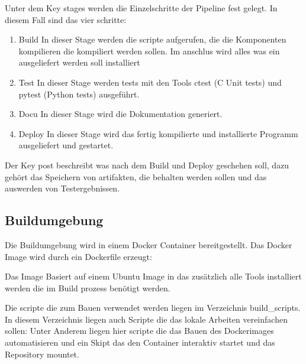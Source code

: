 Unter dem Key   \glqq   stages\grqq{} werden die Einzelschritte der Pipeline fest gelegt. In diesem Fall sind das vier schritte: 
\begin{enumerate}
    \item{Build} In dieser Stage werden die scripte aufgerufen, die die Komponenten kompilieren die kompiliert werden sollen. Im anschlus wird alles was ein ausgeliefert werden soll installiert
    \item{Test} In dieser Stage werden tests mit den Tools ctest (C Unit tests) und pytest (Python tests) ausgeführt.
    \item{Docu} In dieser Stage wird die Dokumentation generiert.
    \item{Deploy} In dieser Stage wird das fertig kompilierte und installierte Programm ausgeliefert und gestartet. 
\end{enumerate}

Der Key \glqq  post\grqq{} beschreibt was nach dem Build und Deploy geschehen soll, dazu gehört das Speichern von artifakten, die behalten werden sollen und das auswerden von Testergebnissen.



\subsection{Buildumgebung}
Die Buildumgebung wird in einem Docker Container bereitgestellt. Das Docker Image wird durch ein Dockerfile erzeugt:



Das Image Basiert auf einem Ubuntu Image in das zusätzlich alle Tools installiert werden die im Build prozess benötigt werden.

Die scripte die zum Bauen verwendet werden liegen im Verzeichnis \glqq build\_scripts\grqq{}. In diesem Verzeichnis liegen auch Scripte die das lokale Arbeiten vereinfachen sollen: Unter Anderem liegen hier scripte die das Bauen des Dockerimages automatisieren und ein Skipt das den Container interaktiv startet und das Repository mountet.
